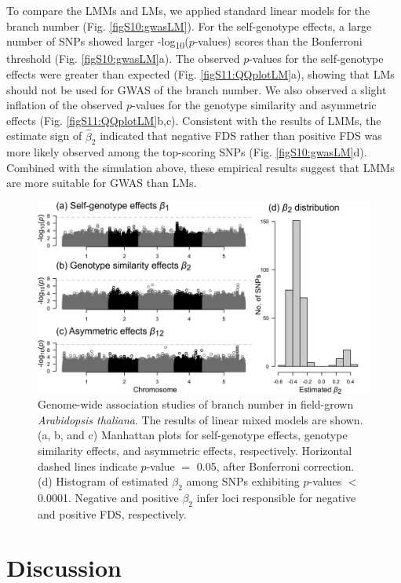 \documentclass[12pt,]{article}
\begin{document}
To compare the LMMs and LMs, we applied standard linear models for the branch number (Fig. \ref{figS10:gwasLM}). For the self-genotype effects, a large number of SNPs showed larger -log\textsubscript{10}($p$-values) scores than the Bonferroni threshold (Fig. \ref{figS10:gwasLM}a). The observed $p$-values for the self-genotype effects were greater than expected (Fig. \ref{figS11:QQplotLM}a), showing that LMs should not be used for GWAS of the branch number. We also observed a slight inflation of the observed $p$-values for the genotype similarity and asymmetric effects (Fig. \ref{figS11:QQplotLM}b,c). Consistent with the results of LMMs, the estimate sign of $\hat{\beta}_2$ indicated that negative FDS rather than positive FDS was more likely observed among the top-scoring SNPs (Fig. \ref{figS10:gwasLM}d). Combined with the simulation above, these empirical results suggest that LMMs are more suitable for GWAS than LMs.

\begin{figure}[ht]
  \includegraphics[width=\linewidth]{ManhattanPlotLMM.png}
  \caption{Genome-wide association studies of branch number in field-grown \textit{Arabidopsis thaliana}. The results of linear mixed models are shown. (a, b, and c) Manhattan plots for self-genotype effects, genotype similarity effects, and asymmetric effects, respectively. Horizontal dashed lines indicate $p$-value $=$ 0.05, after Bonferroni correction. (d) Histogram of estimated $\beta_2$ among SNPs exhibiting $p$-values $<$ 0.0001. Negative and positive $\beta_2$ infer loci responsible for negative and positive FDS, respectively.}
  \label{fig5:gwas}
\end{figure}


\section{Discussion}
\end{document}
